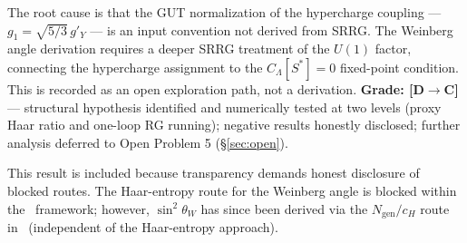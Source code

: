 \documentclass[11pt]{article}
\theoremstyle{remark}
\newcommand{\SRRG}{\text{SRRG}}
\newcommand{\Sstar}{S^*}
\begin{document}
\begin{appendices}
The root cause is that the GUT normalization of the hypercharge coupling ---
$g_1 = \sqrt{5/3}\, g'_Y$ --- is an input convention not derived from SRRG.
The Weinberg angle derivation requires a deeper SRRG treatment of the
$U(1)$ factor, connecting the hypercharge assignment to the $C_\Lambda[\Sstar]=0$
fixed-point condition.
This is recorded as an open exploration path, not a derivation.
\textbf{Grade: [D$\to$C]} --- structural hypothesis identified and numerically tested
at two levels (proxy Haar ratio and one-loop RG running); negative results honestly
disclosed; further analysis deferred to Open Problem 5 (\S\ref{sec:open}).

This result is included because transparency demands honest disclosure of
blocked routes. The Haar-entropy route for the Weinberg angle is blocked within the \SRRG\ framework; however, $\sin^2\theta_W$ has since been derived via the $N_{\mathrm{gen}}/c_H$ route in~\cite{SpivackWeinberg} (independent of the Haar-entropy approach).

\end{appendices}
\end{document}
